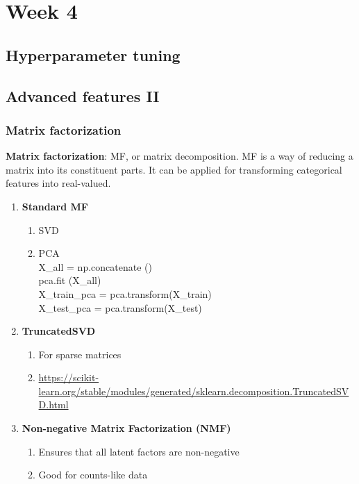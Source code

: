\documentclass[11pt, twoside]{article}   	%
\begin{document}
\pagebreak
\section{Week 4}
\subsection{Hyperparameter tuning}
\subsection{Advanced features II}
\subsubsection{Matrix factorization}
\textbf{Matrix factorization}: MF, or matrix decomposition. MF is a way of reducing a matrix into its constituent parts. It can be applied for transforming categorical features
into real-valued.

\begin{enumerate}
  \item  \textbf{Standard MF}
    \begin{enumerate}
        \item SVD
        \item PCA 
        \\X\_all = np.concatenate \big(\big)
        \\pca.fit \big(X\_all\big)
        \\X\_train\_pca = pca.transform\big(X\_train\big)
       \\X\_test\_pca = pca.transform\big(X\_test\big)
     \end{enumerate}
   \item  \textbf{TruncatedSVD}
    \begin{enumerate}
        \item For sparse matrices
        \item \url{https://scikit-learn.org/stable/modules/generated/sklearn.decomposition.TruncatedSVD.html}
     \end{enumerate}
     
   \item  \textbf{Non-negative Matrix Factorization (NMF)}
    \begin{enumerate}
        \item Ensures that all latent factors are non-negative
        \item Good for counts-like data
     \end{enumerate}
 
  \end{enumerate}
\end{document}
